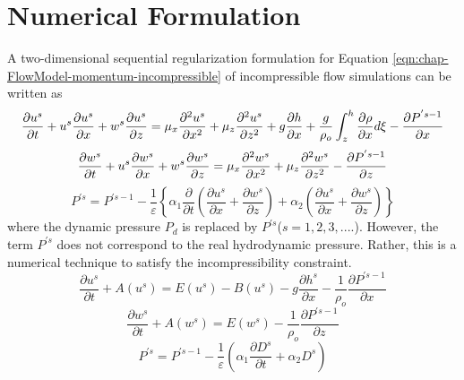 \section{Numerical Formulation}
A two-dimensional sequential regularization formulation for Equation \ref{eqn:chap-FlowModel-momentum-incompressible} of incompressible flow simulations can be written as
\begin{equation}
\frac {\partial u^s}{\partial t} + u^s \frac {\partial
u^s}{\partial x} + w^s \frac {\partial u^s}{\partial z} = \mu_x
\frac {\partial^2 u^s}{\partial x^2}+\mu_z \frac {\partial^2
u^s}{\partial z^2} + g \frac{\partial h}{\partial
x}+\frac{g}{\rho_o} \int_z^h \frac{\partial \rho}{\partial x} d
\xi-\frac {\partial P^{'s-1}}{\partial x} \\
\end{equation}
\begin{equation}
\frac {\partial w^s}{\partial t} + u^s \frac {\partial
w^s}{\partial x} + w^s \frac {\partial w^s}{\partial z} = \mu_x
\frac {\partial^2 w^s}{\partial x^2}+\mu_z \frac {\partial^2
w^s}{\partial z^2} -
\frac {\partial P^{'s-1}}{\partial z} \\
\end{equation}
\vspace{0.1in}
\begin{equation}
P^{'s} = P^{'s-1}-\frac{1}{\varepsilon} \left\{ \alpha_1 \frac
{\partial}{\partial t} \left( \frac {\partial u^s}{\partial x} +
\frac {\partial w^s}{\partial z} \right) + \alpha_2 \left( \frac
{\partial u^s}{\partial x} + \frac {\partial w^s}{\partial z}
\right) \right\}
\end{equation}
where the dynamic pressure $P_d$ is replaced by $P^{'s}$($s=1,2,3,....$). However, the term $P^{'s}$ does not correspond to the real hydrodynamic pressure. Rather, this is a numerical technique to satisfy the incompressibility constraint.
\begin{equation}
\frac {\partial u^s}{\partial t} + A(u^s) =
E(u^s)-B(u^s)-g\frac{\partial h^s}{\partial x}-
\frac{1}{\rho_o}\frac{\partial P^{'s-1}}{\partial x}
\end{equation}
\begin{equation}
\frac {\partial w^s}{\partial t} + A(w^s) = E(w^s)-
\frac{1}{\rho_o}\frac{\partial P^{'s-1}}{\partial z}
\end{equation}
\begin{equation}
P^{'s} = P^{'s-1}-\frac{1}{\varepsilon} \left( \alpha_1 \frac
{\partial D^s}{\partial t}   + \alpha_2 D^s \right)
\end{equation}
